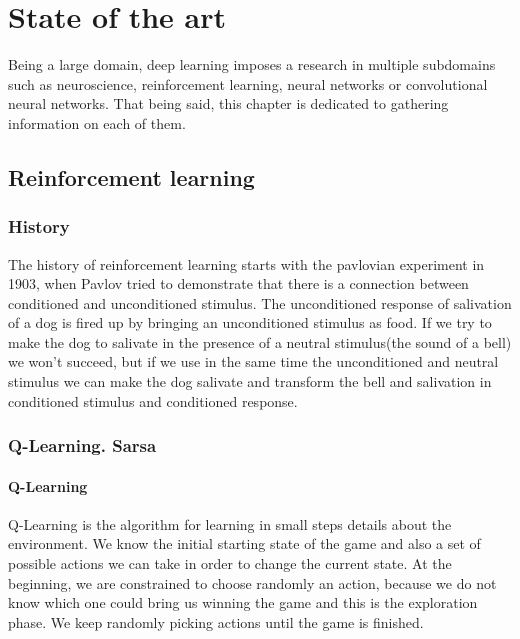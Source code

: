 
\chapter{State of the art}
\label{chapter:state}

Being a large domain, deep learning imposes a research in multiple subdomains such as neuroscience, reinforcement learning, neural networks or convolutional neural networks. That being said, this chapter is dedicated to gathering information on each of them.

\section{Reinforcement learning}
\label{sec:reinforcement}

\subsection{History}
The history of reinforcement learning starts with the pavlovian experiment\cite{pavlov} in 1903, when Pavlov tried to demonstrate that there is a connection between conditioned and unconditioned stimulus. The unconditioned response of salivation of a dog is fired up by bringing an unconditioned stimulus as food. If we try to make the dog to salivate in the presence of a neutral stimulus(the sound of a bell) we won't succeed, but if we use in the same time the unconditioned and neutral stimulus we can make the dog salivate and transform the bell and salivation in conditioned stimulus and conditioned response.

\subsection{Q-Learning. Sarsa}
\label{qlearning-sarsa}

\subsubsection{Q-Learning}
\label{qlearning}
Q-Learning\cite{norvig} is the algorithm for learning in small steps details about the environment. We know the initial starting state of the game and also a set of possible actions we can take in order to change the current state. At the beginning, we are constrained to choose randomly an action, because we do not know which one could bring us winning the game and this is the exploration phase. We keep randomly picking actions until the game is finished.

